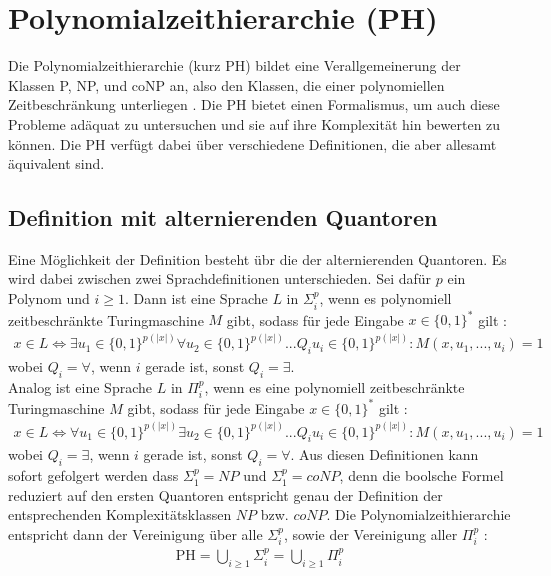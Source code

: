 \chapter{Polynomialzeithierarchie (PH)} \label{chapter: Polynomialzeithierarchie (PH)}
Die Polynomialzeithierarchie (kurz PH) bildet eine Verallgemeinerung der Klassen P, NP, und coNP an, also den Klassen, die einer 
polynomiellen Zeitbeschränkung unterliegen \cite{aaronson_scott_2016}. Die PH bietet einen Formalismus, um auch diese Probleme adäquat zu untersuchen und sie auf ihre Komplexität hin bewerten zu können.
Die PH verfügt dabei über verschiedene Definitionen, die aber allesamt äquivalent sind.


\section{Definition mit alternierenden Quantoren} \label{section: Definition PH mit alternierenden Quantoren}
Eine Möglichkeit der Definition besteht übr die der alternierenden Quantoren. Es wird dabei zwischen zwei Sprachdefinitionen unterschieden.
Sei dafür $p$ ein Polynom und $i \geq 1$. Dann ist eine Sprache $L$ in $\Sigma^p_i$, wenn es polynomiell zeitbeschränkte Turingmaschine $M$ gibt, 
sodass für jede Eingabe $x \in \{0,1\}^*$ gilt \cite{rossman_complexity_2015}:
\begin{align*}
    x \in L \Leftrightarrow \exists u_1 \in \{0,1\}^{p(|x|)} \forall u_2 \in \{0,1\}^{p(|x|)} ... Q_i u_i \in \{0,1\}^{p(|x|)} : M(x, u_1, ..., u_i) = 1
\end{align*}
wobei $Q_i = \forall$, wenn $i$ gerade ist, sonst $Q_i = \exists$. \\
Analog ist eine Sprache $L$ in $\Pi^p_i$, wenn es eine polynomiell zeitbeschränkte Turingmaschine $M$ gibt, sodass für jede Eingabe $x \in \{0,1\}^*$ gilt \cite{arora_computational_2009}:
\begin{align*}
    x \in L \Leftrightarrow \forall u_1 \in \{0,1\}^{p(|x|)} \exists u_2 \in \{0,1\}^{p(|x|)} ... Q_i u_i \in \{0,1\}^{p(|x|)} : M(x, u_1, ..., u_i) = 1
\end{align*}
wobei $Q_i = \exists$, wenn $i$ gerade ist, sonst $Q_i = \forall$.
Aus diesen Definitionen kann sofort gefolgert werden dass $\Sigma^p_1 = NP$ und $\Sigma^p_1 = coNP$, denn die boolsche Formel reduziert auf 
den ersten Quantoren entspricht genau der Definition der entsprechenden Komplexitätsklassen $NP$ bzw. $coNP$.
Die Polynomialzeithierarchie entspricht dann der Vereinigung über alle $\Sigma^p_i$, sowie der Vereinigung aller $\Pi^p_i$ \cite{sipser_introduction_2012}:
\begin{align*}
    \text{PH} = \bigcup_{i \geq 1} \Sigma^p_i = \bigcup_{i \geq 1} \Pi^p_i 
\end{align*}
